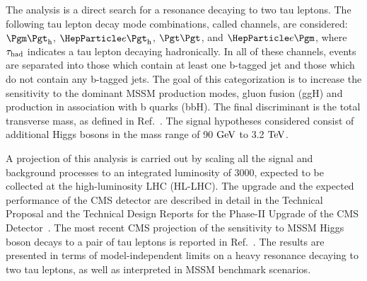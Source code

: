 The analysis is a direct search for a resonance decaying to two tau leptons.
The following tau lepton decay mode combinations, called channels, are considered: $\mutau$, $\etau$,
$\tautau$, and $\emu$, where $\tau_{\text{had}}$ indicates a tau lepton decaying hadronically. In
all of these channels, events are separated into those which contain
at least one b-tagged jet and those which do not contain any b-tagged jets. 
The goal of this categorization is to increase the sensitivity to the dominant MSSM production modes, 
gluon fusion (ggH) and production in association with b quarks (bbH). The final discriminant is the total 
transverse mass, as defined in Ref.~\cite{HIG-17-020}.
The signal hypotheses considered consist of additional Higgs
bosons in the mass range of 90$~\text{GeV}$ to 3.2$~\text{TeV}$.

A projection of this analysis is carried out by scaling all the signal
and background processes to an integrated luminosity of 3000\Uifb, expected to be collected at the high-luminosity LHC (HL-LHC). 
The upgrade and the expected performance of the CMS detector are described in detail
in the Technical Proposal and the Technical Design Reports for the Phase-II Upgrade of the CMS 
Detector~\cite{CMSPhase2TP,CMSPhase2TrackerTDR,CMSPhase2BarrelTDR,CMSPhase2MuonTDR,CMSPhase2EndcapTDR}. 
The most recent CMS projection of the sensitivity to MSSM Higgs boson decays to a pair of tau leptons is reported 
in Ref.~\cite{FTR-16-002}.
The results are presented in terms of model-independent limits on a heavy resonance 
decaying to two tau leptons, as well as interpreted in MSSM benchmark scenarios.

